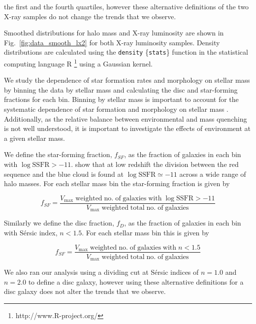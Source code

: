 the first and the fourth quartiles, however these alternative
definitions of the two X-ray samples do not change the trends that we
observe.
\par
Smoothed distributions for halo mass and X-ray luminosity are shown in
Fig.~\ref{fig:data_smooth_lx2} for both X-ray luminosity samples.
Density distributions are calculated using the \texttt{density}
\{\texttt{stats}\} function in the statistical computing language
\textsc{R} \citep{r2013}\footnote{http://www.R-project.org/} using a
Gaussian kernel.
\par
We study the dependence of star formation rates and morphology on
stellar mass by binning the data by stellar mass and calculating the
disc and star-forming fractions for each bin.  Binning by stellar mass
is important to account for the systematic dependence of star
formation and morphology on stellar mass
\citep[e.g.][]{brinchmann2004, whitaker2012}.  Additionally, as the
relative balance between environmental and mass quenching is not well
understood, it is important to investigate the effects of environment
at a given stellar mass.
\par
We define the star-forming fraction, $f_{SF}$, as the fraction of
galaxies in each bin with $\log \mathrm{SSFR} > -11$.
\citet{wetzel2012} show that at low redshift the division between the
red sequence and the blue cloud is found at $\log \mathrm{SSFR} \simeq
-11$ across a wide range of halo masses.  For each stellar mass bin
the star-forming fraction is given by

\begin{equation}
  f_{SF} =
  \frac{V_\mathrm{max}\;\mathrm{weighted}\;\mathrm{no.}\;\mathrm{of}\;\mathrm{galaxies}\;\mathrm{with}\;\log
    \mathrm{SSFR} >
    -11}{V_\mathrm{max}\;\mathrm{weighted}\;\mathrm{total}\;\mathrm{no.}\;\mathrm{of}\;\mathrm{galaxies}}
\end{equation}

\noindent
Similarly we define the disc fraction, $f_D$, as the fraction of
galaxies in each bin with S{\'e}rsic index, $n < 1.5$.  For each
stellar mass bin this is given by

\begin{equation}
  f_{SF} =
  \frac{V_\mathrm{max}\;\mathrm{weighted}\;\mathrm{no.}\;\mathrm{of}\;\mathrm{galaxies}\;\mathrm{with}\;
    n < 1.5}{V_\mathrm{max}\;\mathrm{weighted}\;\mathrm{total}\;\mathrm{no.}\;\mathrm{of}\;\mathrm{galaxies}}
\end{equation}

\noindent
We also ran our analysis using a dividing cut at S{\'e}rsic indices of
$n=1.0$ and $n=2.0$ to define a disc galaxy, however using these
alternative definitions for a disc galaxy does not alter the trends
that we observe.

